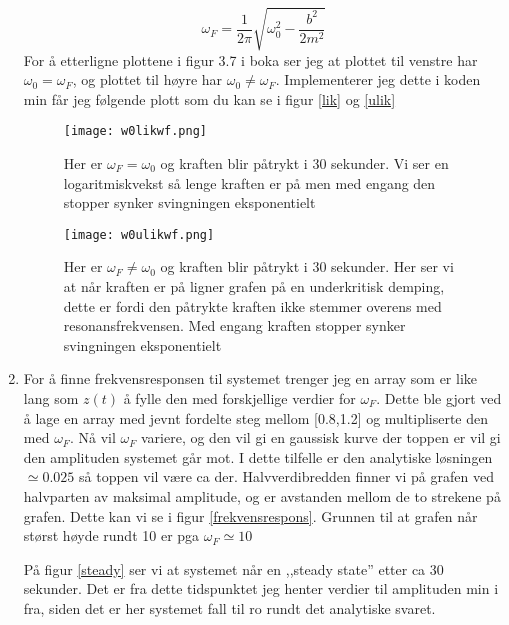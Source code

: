 \documentclass[a4paper,12pt,norsk]{article}
\begin{document}
\begin{enumerate}[label=(\alph*)]
$$
\omega_F = \frac{1}{2\pi}\sqrt{\omega_0^2-\frac{b^2}{2m^2}}
$$
For å etterligne plottene i figur 3.7 i boka \cite{vistnes16} ser jeg at plottet til venstre har $\omega_0 = \omega_F$, og plottet til høyre har $\omega_0 \neq \omega_F$. Implementerer jeg dette i koden min får jeg følgende plott som du kan se i figur \ref{lik} og \vref{ulik}

\begin{figure}[h!]
	\begin{minipage}[b]{\linewidth}
	\texttt{[image: w0likwf.png]} 
	\caption[$\omega_0 = \omega_F$]{Her er $\omega_F = \omega_0$ og kraften blir påtrykt i 30 sekunder. Vi ser en logaritmiskvekst så lenge kraften er på men med engang den stopper synker svingningen eksponentielt}
	\label{lik}
	\end{minipage}
	\hspace{0.5cm}
	\begin{minipage}[b]{\linewidth}
	\texttt{[image: w0ulikwf.png]} 
	\caption[$\omega_0 \neq \omega_F$]{Her er $\omega_F \neq \omega_0$ og kraften blir påtrykt i 30 sekunder. Her ser vi at når kraften er på ligner grafen på en underkritisk demping, dette er fordi den påtrykte kraften ikke stemmer overens med resonansfrekvensen. Med engang kraften stopper synker svingningen eksponentielt}
	\label{ulik}
	\end{minipage}
\end{figure}
\item
For å finne frekvensresponsen til systemet trenger jeg en array som er like lang som $z(t)$ å fylle den med forskjellige verdier for $\omega_F$. Dette ble gjort ved å lage en array med jevnt fordelte steg mellom [0.8,1.2] og multipliserte den med $\omega_F$. Nå vil $\omega_F$ variere, og den vil gi en gaussisk kurve der toppen er vil gi den amplituden systemet går mot. I dette tilfelle er den analytiske løsningen $\simeq 0.025$ så toppen vil være ca der. Halvverdibredden finner vi på grafen ved halvparten av maksimal amplitude, og er avstanden mellom de to strekene på grafen.
Dette kan vi se i figur \vref{frekvensrespons}. Grunnen til at grafen når størst høyde rundt 10 er pga $\omega_F \simeq 10$

På figur \vref{steady} ser vi at systemet når en ,,steady state'' etter ca 30 sekunder. Det er fra dette tidspunktet jeg henter verdier til amplituden min i fra, siden det er her systemet fall til ro rundt det analytiske svaret. 


\end{enumerate}
\end{document}
